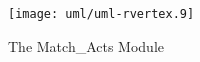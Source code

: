 \begin{figure}[htp]
  \begin{center}
    \texttt{[image: uml/uml-rvertex.9]}

    \caption{The Match\_Acts Module}
    \label{fig:sim-modules-actions-match}
  \end{center}
\end{figure}